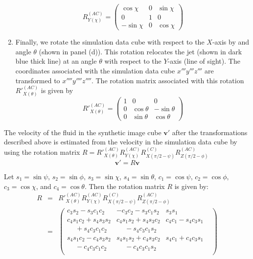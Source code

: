 \documentclass[useAMS, usenatbib]{mn2e}
\begin{document}
\begin{enumerate}
\begin{equation}
R^{(AC)}_{Y(\chi)} = \begin{pmatrix}
 \cos\chi & 0 & \sin\chi \\
0 & 1  & 0 \\
-\sin\chi & 0 & \cos\chi
\end{pmatrix}  
\end{equation}
\item Finally, we rotate the simulation data cube with respect to the $X$-axis by and angle $\theta$ (shown in panel (d)). This rotation relocates the jet (shown in dark blue thick line) at an angle $\theta$ with respect to the $Y$-axis (line of sight). The coordinates associated with the simulation data cube $x'''y'''z'''$ are transformed to $x''''y''''z''''$. The rotation matrix associated with this rotation $R'^{(AC)}_{X(\theta)}$ is given by
 \begin{equation}
  R'^{(AC)}_{X(\theta)} = \begin{pmatrix}
 1 & 0 & 0 \\
0 & \cos\theta & -\sin\theta \\
0 & \sin\theta & \cos\theta 
\end{pmatrix}  
\end{equation}
\end{enumerate} 

The velocity of the fluid in the synthetic image cube $\textbf{v}'$ after the transformations described above is estimated from the velocity in the simulation data cube by using the rotation matrix $R = R'^{(AC)}_{X(\theta)} R^{(AC)}_{Y(\chi)} R^{(C)}_{X(\pi/2 - \psi)} R^{(AC)}_{Z(\pi/2 - \phi)}$
\begin{equation}
\textbf{v}' = R \textbf{v}
\end{equation}

Let $s_1 = \sin \psi$, $s_2 = \sin \phi$, $s_3 = \sin \chi$, $s_4 = \sin \theta$, $c_1 = \cos \psi$,  $c_2 = \cos \phi$, $c_3 = \cos \chi$, and $c_4 = \cos\theta$. Then the rotation matrix $R$ is given by:
 \begin{eqnarray}
  R &=&  R'^{(AC)}_{X(\theta)} R^{(AC)}_{Y(\chi)} R^{(C)}_{X(\pi/2 - \psi)} R^{(AC)}_{Z(\pi/2 - \phi)} \nonumber \\
  &=&  \begin{pmatrix}
  c_3 s_2 - s_3 c_1 c_2  & -c_3 c_2 -s_3 c_1 s_2 & s_3 s_1 \\[6pt]
  c_4 s_1 c_2 + s_4 s_3 s_2  &  c_4 s_1 s_2 + s_4 s_3 c_2 & c_4 c_1 - s_4 c_3 s_1  \\
\phantom{{}+{}}+ s_4 c_3 c_1 c_2 & \phantom{{}+{}}- s_4 c_3 c_1 s_2  & & \\[6pt]
   s_4 s_1 c_2 - c_4 s_3 s_2 & s_4 s_1 s_2 + c_4 s_3 c_2  &  s_4 c_1 + c_4 c_3 s_1 \\
\phantom{{}+{}} - c_4 c_3 c_1c_2   &\phantom{{}+{}}-c_4 c_3 c_1 s_2  & & \\
\end{pmatrix} \nonumber 
\end{eqnarray}
\end{document}
